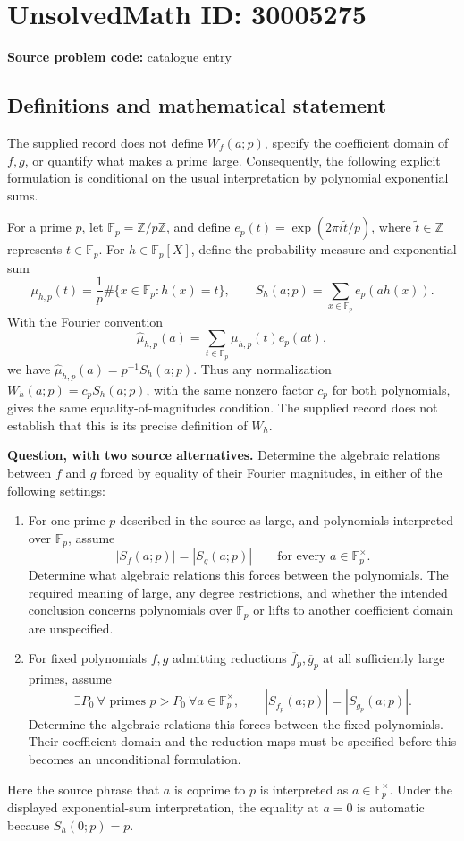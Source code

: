 \documentclass[11pt]{article}
\newcommand{\Z}{\mathbb{Z}}
\newcommand{\F}{\mathbb{F}}
\begin{document}
\section*{UnsolvedMath ID: 30005275}
\textbf{Source problem code:} catalogue entry
\subsection{Definitions and mathematical statement}
The supplied record does not define \(W_f(a;p)\), specify the coefficient domain of \(f,g\), or quantify what makes a prime large. Consequently, the following explicit formulation is conditional on the usual interpretation by polynomial exponential sums.

For a prime \(p\), let \(\F_p=\Z/p\Z\), and define \(e_p(t)=\exp(2\pi i\widetilde t/p)\), where \(\widetilde t\in\Z\) represents \(t\in\F_p\). For \(h\in\F_p[X]\), define the probability measure and exponential sum
\[
\mu_{h,p}(t)=\frac{1}{p}\#\{x\in\F_p:h(x)=t\},\qquad
S_h(a;p)=\sum_{x\in\F_p}e_p(ah(x)).
\]
With the Fourier convention
\[
\widehat\mu_{h,p}(a)=\sum_{t\in\F_p}\mu_{h,p}(t)e_p(at),
\]
we have \(\widehat\mu_{h,p}(a)=p^{-1}S_h(a;p)\). Thus any normalization \(W_h(a;p)=c_pS_h(a;p)\), with the same nonzero factor \(c_p\) for both polynomials, gives the same equality-of-magnitudes condition. The supplied record does not establish that this is its precise definition of \(W_h\).

\textbf{Question, with two source alternatives.} Determine the algebraic relations between \(f\) and \(g\) forced by equality of their Fourier magnitudes, in either of the following settings:
\begin{enumerate}
\item For one prime \(p\) described in the source as large, and polynomials interpreted over \(\F_p\), assume
\[
|S_f(a;p)|=|S_g(a;p)|\qquad\text{for every }a\in\F_p^{\times}.
\]
Determine what algebraic relations this forces between the polynomials. The required meaning of large, any degree restrictions, and whether the intended conclusion concerns polynomials over \(\F_p\) or lifts to another coefficient domain are unspecified.
\item For fixed polynomials \(f,g\) admitting reductions \(\overline f_p,\overline g_p\) at all sufficiently large primes, assume
\[
\exists P_0\ \forall\text{ primes }p>P_0\ \forall a\in\F_p^{\times},\qquad
|S_{\overline f_p}(a;p)|=|S_{\overline g_p}(a;p)|.
\]
Determine the algebraic relations this forces between the fixed polynomials. Their coefficient domain and the reduction maps must be specified before this becomes an unconditional formulation.
\end{enumerate}
Here the source phrase that \(a\) is coprime to \(p\) is interpreted as \(a\in\F_p^{\times}\). Under the displayed exponential-sum interpretation, the equality at \(a=0\) is automatic because \(S_h(0;p)=p\).
\end{document}
